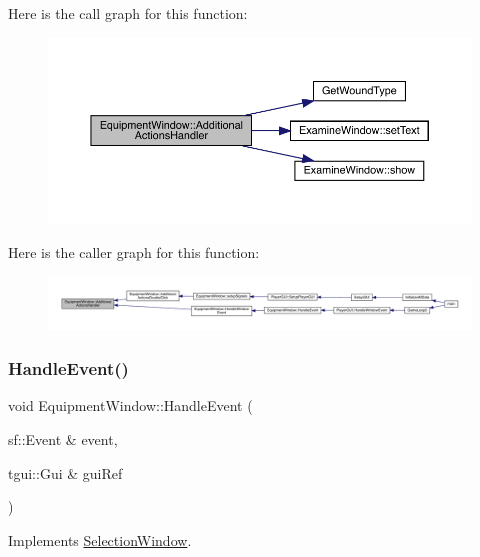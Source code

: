 Here is the call graph for this function\+:
\nopagebreak
\begin{figure}[H]
\begin{center}
\leavevmode
\includegraphics[width=350pt]{d8/dcb/class_equipment_window_aa97046abad40cd1b4003fef694686992_cgraph}
\end{center}
\end{figure}
Here is the caller graph for this function\+:
\nopagebreak
\begin{figure}[H]
\begin{center}
\leavevmode
\includegraphics[width=350pt]{d8/dcb/class_equipment_window_aa97046abad40cd1b4003fef694686992_icgraph}
\end{center}
\end{figure}
\mbox{\label{class_equipment_window_aea251bbf9967a0f39ccca5df854adcbe}} 
\subsubsection{\texorpdfstring{Handle\+Event()}{HandleEvent()}}
{\footnotesize\ttfamily void Equipment\+Window\+::\+Handle\+Event (\begin{DoxyParamCaption}\item[{sf\+::\+Event \&}]{event,  }\item[{tgui\+::\+Gui \&}]{gui\+Ref }\end{DoxyParamCaption})\hspace{0.3cm}{\ttfamily [virtual]}}



Implements \mbox{\hyperlink{class_selection_window_a2a7aa65a4c77fce6f2a44a0d10b911eb}{Selection\+Window}}.

